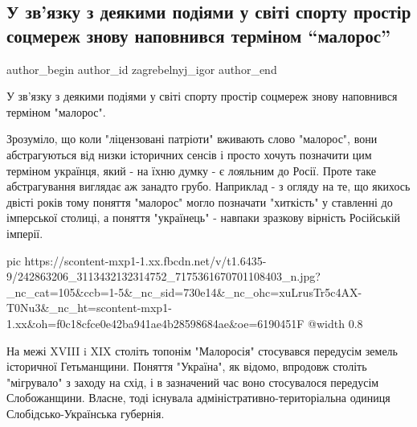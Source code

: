  
 
 
 
 
 
\subsection{У зв'язку з деякими подіями у світі спорту простір соцмереж знову наповнився терміном \enquote{малорос}}
\label{sec:26_09_2021.fb.zagrebelnyj_igor.1.malorossia}
 
\ifcmt
 author_begin
   author_id zagrebelnyj_igor
 author_end
\fi

У зв'язку з деякими подіями у світі спорту простір соцмереж знову наповнився
терміном "малорос".

Зрозуміло, що коли "ліцензовані патріоти" вживають слово "малорос", вони
абстрагуються від низки історичних сенсів і просто хочуть позначити цим
терміном українця, який - на їхню думку - є лояльним до Росії. Проте таке
абстрагування виглядає аж занадто грубо. Наприклад - з огляду на те, що якихось
двісті років тому поняття "малорос" могло позначати "хиткість" у ставленні до
імперської столиці, а поняття "українець" - навпаки зразкову вірність
Російській імперії.

\ifcmt
  pic https://scontent-mxp1-1.xx.fbcdn.net/v/t1.6435-9/242863206_3113432132314752_7175361670701108403_n.jpg?_nc_cat=105&ccb=1-5&_nc_sid=730e14&_nc_ohc=xuLrusTr5c4AX-T0Nu3&_nc_ht=scontent-mxp1-1.xx&oh=f0c18cfce0e42ba941ae4b28598684ae&oe=6190451F
  @width 0.8
\fi

На межі XVIII i XIX століть топонім "Малоросія" стосувався передусім земель
історичної Гетьманщини. Поняття "Україна", як відомо, впродовж століть
"мігрувало" з заходу на схід, і в зазначений час воно стосувалося передусім
Слобожанщини. Власне, тоді існувала адміністративно-територіальна одиниця
Слобідсько-Українська губернія.

